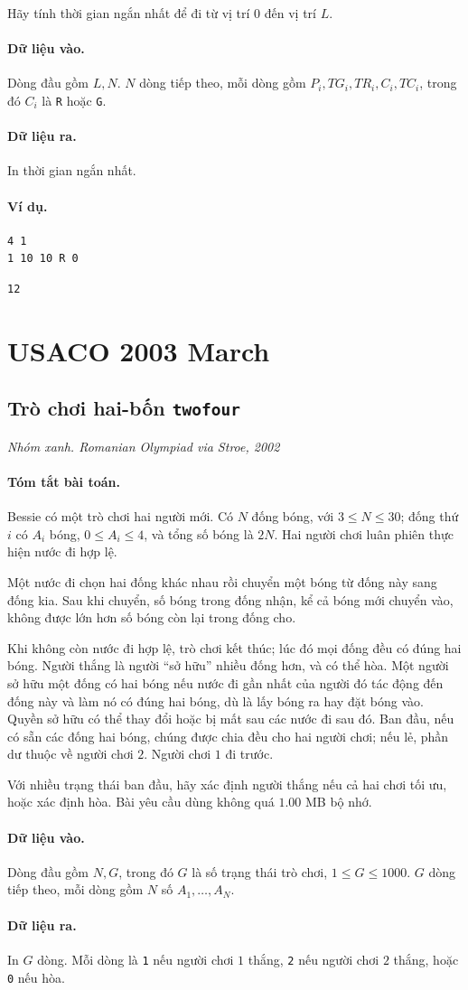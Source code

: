 \documentclass[11pt]{article}
\newcommand{\problem}[4]{%
  \subsection[#1 (#2)]{#1 \hfill {\normalsize\texttt{#2}}}%
  \noindent\textit{#3. #4}\par\smallskip
}
\newcommand{\iosec}[1]{\paragraph{#1}}
\begin{document}
Hãy tính thời gian ngắn nhất để đi từ vị trí \(0\) đến vị trí \(L\).

\iosec{Dữ liệu vào.}
Dòng đầu gồm \(L,N\). \(N\) dòng tiếp theo, mỗi dòng gồm
\(P_i,TG_i,TR_i,C_i,TC_i\), trong đó \(C_i\) là \texttt{R} hoặc \texttt{G}.

\iosec{Dữ liệu ra.}
In thời gian ngắn nhất.

\iosec{Ví dụ.}
\begin{verbatim}
4 1
1 10 10 R 0
\end{verbatim}

\begin{verbatim}
12
\end{verbatim}

\section{USACO 2003 March}

\problem{Trò chơi hai-bốn}{twofour}{Nhóm xanh}{Romanian Olympiad via Stroe, 2002}

\iosec{Tóm tắt bài toán.}
Bessie có một trò chơi hai người mới. Có \(N\) đống bóng, với \(3\le N\le 30\);
đống thứ \(i\) có \(A_i\) bóng, \(0\le A_i\le 4\), và tổng số bóng là \(2N\).
Hai người chơi luân phiên thực hiện nước đi hợp lệ.

Một nước đi chọn hai đống khác nhau rồi chuyển một bóng từ đống này sang đống
kia. Sau khi chuyển, số bóng trong đống nhận, kể cả bóng mới chuyển vào, không
được lớn hơn số bóng còn lại trong đống cho.

Khi không còn nước đi hợp lệ, trò chơi kết thúc; lúc đó mọi đống đều có đúng
hai bóng. Người thắng là người ``sở hữu'' nhiều đống hơn, và có thể hòa. Một
người sở hữu một đống có hai bóng nếu nước đi gần nhất của người đó tác động
đến đống này và làm nó có đúng hai bóng, dù là lấy bóng ra hay đặt bóng vào.
Quyền sở hữu có thể thay đổi hoặc bị mất sau các nước đi sau đó. Ban đầu, nếu
có sẵn các đống hai bóng, chúng được chia đều cho hai người chơi; nếu lẻ, phần
dư thuộc về người chơi \(2\). Người chơi \(1\) đi trước.

Với nhiều trạng thái ban đầu, hãy xác định người thắng nếu cả hai chơi tối ưu,
hoặc xác định hòa. Bài yêu cầu dùng không quá \(1.00\) MB bộ nhớ.

\iosec{Dữ liệu vào.}
Dòng đầu gồm \(N,G\), trong đó \(G\) là số trạng thái trò chơi,
\(1\le G\le 1000\). \(G\) dòng tiếp theo, mỗi dòng gồm \(N\) số
\(A_1,\ldots,A_N\).

\iosec{Dữ liệu ra.}
In \(G\) dòng. Mỗi dòng là \texttt{1} nếu người chơi \(1\) thắng, \texttt{2}
nếu người chơi \(2\) thắng, hoặc \texttt{0} nếu hòa.
\end{document}
